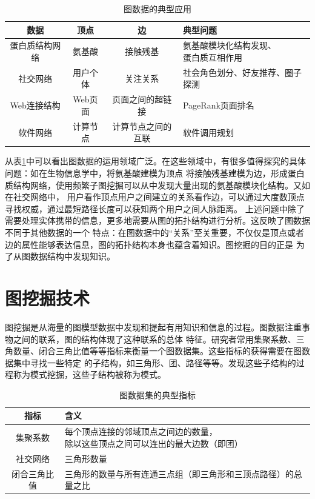\documentclass[master]{thesis-uestc}
\begin{document}
\begin{table}
   \begin{tabular}{|c|c|c|l|}
    \hline
    数据 & 顶点 & 边 & 典型问题\\
    \hline
    蛋白质结构网络 & 氨基酸 & 接触残基 & \makecell[l]{氨基酸模块化结构发现、\\蛋白质互相作用~\cite{Spontaneous}}\\
    \hline
    社交网络 &用户个体 & 关注关系 & 社会角色划分、好友推荐、圈子探测~\cite{Role} \\
    \hline
    Web连接结构 &Web页面&页面之间的超链接 & PageRank页面排名~\cite{PageRank}\\
    \hline
    软件网络& 计算节点& 计算节点之间的互联 & 软件调用规划~\cite{SoftwareHomology}\\
    \hline
   \end{tabular} 
   \caption{图数据的典型应用}
   \label{tab:graph-app}

\end{table}

    从表\ref{tab:graph-app}中可以看出图数据的运用领域广泛。在这些领域中，有很多值得探究的具体问题：如在生物信息学中，将氨基酸建模为顶点
将接触残基建模为边，形成蛋白质结构网络，使用频繁子图挖掘可以从中发现大量出现的氨基酸模块化结构。又如在社交网络中，
用户看作顶点用户之间建立的关系看作边，可以通过大度数顶点寻找权威，通过最短路径长度可以获知两个用户之间人脉距离。
上述问题中除了需要处理实体携带的信息，更多地需要从图的拓扑结构进行分析。这反映了图数据不同于其他数据的一个
特点：在图数据中的“关系”至关重要，不仅仅是顶点或者边的属性能够表达信息，图的拓扑结构本身也蕴含着知识。图挖掘的目的正是
为了从图数据结构中发现知识。

\section{图挖掘技术}
\label{sec:graph-mining}

    图挖掘是从海量的图模型数据中发现和提起有用知识和信息的过程。图数据注重事物之间的联系，图的结构体现了这种联系的总体
特征。研究者常用集聚系数、三角数量、闭合三角比值等等指标来衡量一个图数据集。这些指标的获得需要在图数据集中寻找一些特定
的子结构，如三角形、团、路径等等。发现这些子结构的过程称为模式挖掘，这些子结构被称为模式。

\begin{table}
    \label{tab:graph-parameter}
   \caption{图数据集的典型指标}
   \begin{tabular}{|c|l|}
    \hline
    指标 & 含义\\
    \hline
    集聚系数 &  \makecell[l]{每个顶点连接的邻域顶点之间边的数量，\\除以这些顶点之间可以连出的最大边数（即团）} \\
    \hline
    社交网络 & 三角形数量 \\
    \hline
    闭合三角比值 & 三角形的数量与所有连通三点组（即三角形和三顶点路径）的总量之比\\
    \hline
   \end{tabular} 
\end{table}
\end{document}
